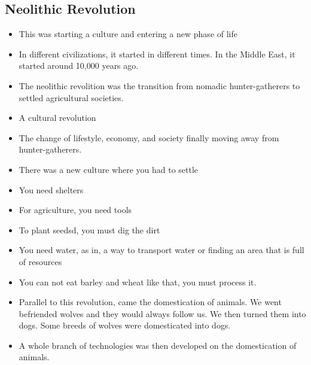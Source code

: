 \documentclass{article}
\begin{document}
\subsection{Neolithic Revolution}
\begin{itemize}
  \item This was starting a culture and entering a new
    phase of life
  \item In different civilizations, it started in different times.
    In the Middle East, it started around 10,000 years ago.
  \item The neolithic revolition was the transition
    from nomadic hunter-gatherers to settled agricultural societies.

  \item A cultural revolution
  \item The change of lifestyle, economy, and society finally moving
    away from hunter-gatherers.
  \item There was a new culture where you had to settle
  \item You need shelters
  \item For agriculture, you need tools
  \item To plant seedsd, you must dig the dirt
  \item You need water, as in, a way to transport water
    or finding an area that is full of resources
  \item You can not eat barley and wheat like that, you must
    process it.
  \item Parallel to this revolution, came the domestication of animals.
    We went befriended wolves and they would always follow us.
    We then turned them into dogs.
    Some breeds of wolves were domesticated into dogs.
  \item A whole branch of technologies was then
    developed on the domestication of animals.
\end{itemize}
\end{document}
